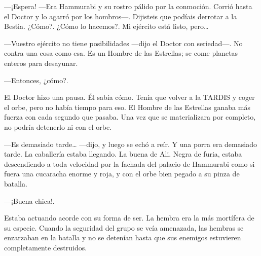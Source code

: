 ---¡Espera! ---Era Hammurabi y su rostro pálido por la conmoción. Corrió
hasta el Doctor y lo agarró por los hombros---. Dijisteis que podíais
derrotar a la Bestia. ¿Cómo?. ¿Cómo lo hacemos?. Mi ejército está listo,
pero\ldots{}

---Vuestro ejército no tiene posibilidades ---dijo el Doctor con
seriedad---. No contra una cosa como esa. Es un Hombre de las Estrellas;
se come planetas enteros para desayunar.

---Entonces, ¿cómo?.

El Doctor hizo una pausa. Él sabía cómo. Tenía que volver a la TARDIS y
coger el orbe, pero no había tiempo para eso. El Hombre de las Estrellas
ganaba más fuerza con cada segundo que pasaba. Una vez que se
materializara por completo, no podría detenerlo ni con el orbe.

---Es demasiado tarde\ldots{} ---dijo, y luego se echó a reír. Y una
porra era demasiado tarde. La caballería estaba llegando. La buena de
Ali. Negra de furia, estaba descendiendo a toda velocidad por la fachada
del palacio de Hammurabi como si fuera una cucaracha enorme y roja, y
con el orbe bien pegado a su pinza de batalla.

---¡Buena chica!.

Estaba actuando acorde con su forma de ser. La hembra era la más
mortífera de su especie. Cuando la seguridad del grupo se veía
amenazada, las hembras se enzarzaban en la batalla y no se detenían
hasta que sus enemigos estuvieren completamente destruidos.